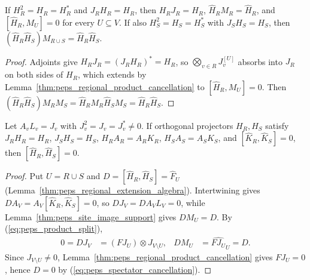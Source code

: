\begin{lemma}%
    \label{thm:peps_site_image_support}
    \leanok
    If $H_R^2=H_R=H_R^*$ and $J_RH_R=H_R$, then $H_RJ_R=H_R$,
    $\widehat H_RM_R=\widehat H_R$, and $[\widehat H_R,M_U]=0$ for every $U\subseteq V$.
    If also $H_S^2=H_S=H_S^*$ with $J_SH_S=H_S$, then
    $(\widehat H_R\widehat H_S)M_{R\cup S}=\widehat H_R\widehat H_S$.
\end{lemma}
\begin{proof}\leanok
    Adjoints give $H_RJ_R=(J_RH_R)^*=H_R$, so $\bigotimes_{v\in R}J_v^{[U]}$
    absorbs into $J_R$ on both sides of $H_R$, which extends by
    Lemma~\ref{thm:peps_regional_product_cancellation} to $[\widehat H_R,M_U]=0$.
    Then $(\widehat H_R\widehat H_S)M_RM_S=\widehat H_RM_R\widehat H_SM_S=\widehat H_R\widehat H_S$.
\end{proof}

\begin{lemma}%
    \label{thm:peps_product_transport_commutation}
    \leanok
    Let $A_vL_v=J_v$ with $J_v^2=J_v=J_v^*\ne0$. If orthogonal projectors
    $H_R,H_S$ satisfy $J_RH_R=H_R$, $J_SH_S=H_S$, $H_RA_R=A_RK_R$,
    $H_SA_S=A_SK_S$, and $[\widehat K_R,\widehat K_S]=0$, then
    $[\widehat H_R,\widehat H_S]=0$.
\end{lemma}
\begin{proof}\leanok
    Put $U=R\cup S$ and $D=[\widehat H_R,\widehat H_S]=\widehat F_U$
    (Lemma~\ref{thm:peps_regional_extension_algebra}). Intertwining gives
    $DA_V=A_V[\widehat K_R,\widehat K_S]=0$, so $DJ_V=DA_VL_V=0$, while
    Lemma~\ref{thm:peps_site_image_support} gives $DM_U=D$. By
    (\ref{eq:peps_product_split}),
    \begin{align}
        0=DJ_V & =(FJ_U)\otimes J_{V\setminus U}, &
        DM_U   & =\widehat{FJ_U}_U=D.
        \label{eq:peps_spectator_cancellation}
    \end{align}
    Since $J_{V\setminus U}\ne0$, Lemma~\ref{thm:peps_regional_product_cancellation}
    gives $FJ_U=0$, hence $D=0$ by (\ref{eq:peps_spectator_cancellation}).
\end{proof}

